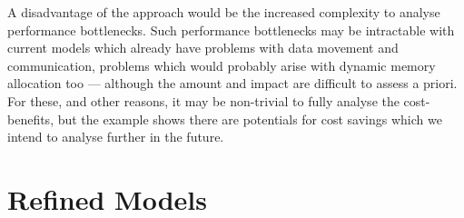 \documentclass{../../template/esiwace-report}
\begin{document}
A disadvantage of the approach would be the increased complexity to analyse performance bottlenecks. Such performance bottlenecks may be intractable with current models which already have problems with data movement and communication, problems which would probably arise with dynamic memory allocation too --- although the amount and impact are difficult to assess a priori. For these, and other reasons, it may be non-trivial to fully analyse the cost-benefits, but the example shows there are potentials for cost savings which we intend to analyse further in the future.
%
%
%
%
%
%
%
%
%
%
%
%
%
%
%
%
%
%
%
%



\newpage
\chapter{Refined Models}
\label{sec:refined models}
\end{document}
